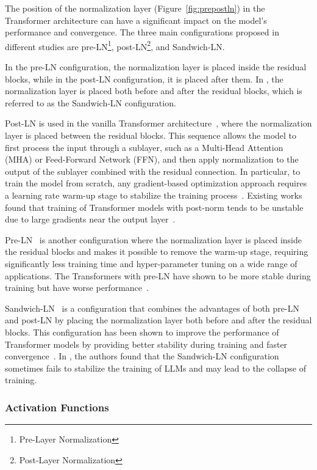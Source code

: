 The position of the normalization layer (Figure~\ref{fig:prepostln}) in the Transformer architecture can have a significant impact on the model's performance and convergence.
The three main configurations proposed in different studies are pre-LN\footnote{Pre-Layer Normalization}, post-LN\footnote{Post-Layer Normalization}, and Sandwich-LN\@.

In the pre-LN configuration, the normalization layer is placed inside the residual blocks, while in the post-LN configuration, it is placed after them.
In \textcite{ding2021cogview}, the normalization layer is placed both before and after the residual blocks, which is referred to as the Sandwich-LN configuration.

Post-LN is used in the vanilla Transformer architecture~\cite{vaswani2023attention}, where the normalization layer is placed between the residual blocks.
This sequence allows the model to first process the input through a sublayer, such as a Multi-Head Attention (MHA) or Feed-Forward Network (FFN), and then apply normalization to the output of the sublayer combined with the residual connection.
In particular, to train the model from scratch, any gradient-based optimization approach requires a learning rate warm-up stage to stabilize the training process~\cite{vaswani2023attention}.
Existing works found that training of Transformer models with post-norm tends to be unstable due to large gradients near the output layer~\cite{xiong2020layer}.

Pre-LN~\cite{baevski2019adaptive} is another configuration where the normalization layer is placed inside the residual blocks and makes it possible to remove the warm-up stage, requiring significantly less training time and hyper-parameter tuning on a wide range of applications.
The Transformers with pre-LN have shown to be more stable during training but have worse performance~\cite{liu2020understanding}.

Sandwich-LN~\cite{ding2021cogview} is a configuration that combines the advantages of both pre-LN and post-LN by placing the normalization layer both before and after the residual blocks.
This configuration has been shown to improve the performance of Transformer models by providing better stability during training and faster convergence~\cite{ding2021cogview}.
In \textcite{zeng2022glm130b}, the authors found that the Sandwich-LN configuration sometimes fails to stabilize the training of LLMs and may lead to the collapse of training.

\subsubsection{Activation Functions}
\label{subsubsec:activation-functions}

